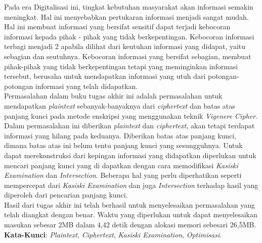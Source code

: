 \begin{abstrak}
		\indent Pada era Digitalisasi ini, tingkat kebutuhan masyarakat akan informasi semakin meningkat. Hal ini menyebabkan pertukaran informasi menjadi sangat mudah. Hal ini membuat informasi yang bersifat sensitif dapat terjadi kebocoran informasi kepada pihak - pihak yang tidak berkepentingan. Kebocoran informasi terbagi menjadi 2 apabila dilihat dari keutuhan informasi yang didapat, yaitu sebagian dan seutuhnya. Kebocoran informasi yang bersifat sebagian, membuat pihak-pihak yang tidak berkepentingan tetapi yang meminginkan informasi tersebut, berusaha untuk mendapatkan informasi yang utuh dari potongan-potongan informasi yang telah didapatkan. 
\\
\indent Permasalahan dalam buku tugas akhir ini adalah permasalahan untuk mendapatkan \textit{plaintext} sebanyak-banyaknya dari \textit{ciphertext} dan batas atas panjang kunci pada metode enskripsi yang menggunakan teknik \textit{Vigenere Cipher}. Dalam permasalahan ini diberikan \textit{plaintext} dan \textit{ciphertext}, akan tetapi terdapat informasi yang hilang pada keduanya. Diberikan batas atas panjang kunci, dimana batas atas ini belum tentu panjang kunci yang sesungguhnya. Untuk dapat merekonstruksi \plaintext dari kepingan informasi yang didapatkan diperlukan untuk mencari panjang kunci yang di dapatkan dengan cara memodifikasi \textit{Kasiski Examination} dan \textit{Intersection}. Beberapa hal yang perlu diperhatikan seperti mempercepat dari \textit{Kasiski Examination} dan juga \textit{Intersection} terhadap hasil yang diperoleh dari pencarian panjang kunci.
\\  
\indent Hasil dari tugas akhir ini telah berhasil untuk menyelesaikan permasalahan yang telah diangkat dengan benar. Waktu yang diperlukan untuk dapat menyelesaikan masukan sebesar 2MB dalam 4,42 detik dengan alokasi memori sebesari 26,5MB.
\\
\noindent \textbf{Kata-Kunci}:  \textit{Plaintext}, \textit{Ciphertext}, \textit{Kasiski Examination},  \textit{Optimisasi}.
\end{abstrak}


